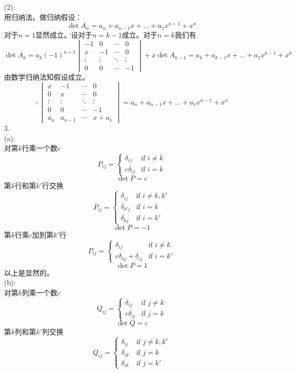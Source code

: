 \documentclass{ctexart}
\begin{document}
(2):\\
用归纳法。做归纳假设：
\[\det A_n=a_n+a_{n-1}x+\dots+a_1x^{n-1}+x^n\]
对于$n=1$显然成立。设对于$n=k-1$成立。对于$n=k$我们有
\[\det A_k=a_k(-1)^{n+1}\begin{vmatrix}
-1&0&\cdots&0\\
x&-1&\cdots&0\\
\vdots&\vdots&\ddots&\vdots\\
0&0&\cdots&-1
\end{vmatrix}+x\det A_{k-1}
=a_k+a_{k-1}x+\dots+a_1x^{k-1}+x^{k}\]
由数学归纳法知假设成立。
\[\therefore\begin{vmatrix}
	x&-1&\cdots&0\\
	0&x&\cdots&0\\
	\vdots&\vdots&\ddots&\vdots\\
	0&0&\cdots&-1\\
	a_n&a_{n-1}&\cdots&x+a_1
\end{vmatrix}=a_n+a_{n-1}x+\dots+a_1x^{n-1}+x^n\]
3.\\
(a):\\
对第$k$行乘一个数$c$
\[P_{ij}=\begin{cases}
	\delta_{ij}&\text{if } i\neq k\\
	c\delta_{ij}&\text{if } i=k
\end{cases}\]
\[\det P=c\]
第$k$行和第$k'$行交换
\[P_{ij}=\begin{cases}
	\delta_{ij}&\text{if } i\neq k,k'\\
	\delta_{k'j}&\text{if } i=k\\
	\delta_{kj}&\text{if }i=k'
\end{cases}\]
\[\det P=-1\]
第$k$行乘$c$加到第$k'$行
\[P_{ij}=\begin{cases}
	\delta_{ij}&\text{if } i\neq k\\
	c\delta_{kj}+\delta_{ij}&\text{if } i=k'
\end{cases}\]
\[\det P=1\]
以上是显然的。\\
(b):\\
对第$k$列乘一个数$c$
\[Q_{ij}=\begin{cases}
	\delta_{ij}&\text{if } j\neq k\\
	c\delta_{ij}&\text{if } j=k
\end{cases}\]
\[\det Q=c\]
第$k$列和第$k'$列交换
\[Q_{ij}=\begin{cases}
	\delta_{ij}&\text{if } j\neq k,k'\\
	\delta_{ik'}&\text{if } j=k\\
	\delta_{ik}&\text{if }j=k'
\end{cases}\]
\end{document}
